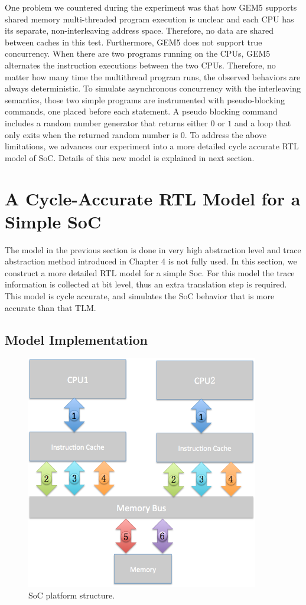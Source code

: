 \documentclass[12pt,frontmatter,copyright,thesis]{usfmanus}
\begin{document}
One problem we countered during the experiment  was that
how GEM5 supports shared memory
multi-threaded program execution is unclear and
each CPU has its separate, non-interleaving address space. 
Therefore,
no data are shared between caches in this test.
Furthermore, GEM5 does not support true concurrency.  When
there are two programs running on the CPUs, GEM5 alternates
the instruction executions between the two CPUs. Therefore,
no matter how many time the
multithread program runs, 
the observed behaviors are always deterministic.
To simulate
asynchronous concurrency with the interleaving semantics,
those two simple programs are instrumented with
pseudo-blocking commands, one placed before each statement.
A pseudo blocking command includes a random number generator
that returns either $0$ or $1$ and a loop that only exits
when the returned random number is $0$.
To address the above limitations,
we advances our experiment into a
more detailed cycle accurate RTL model of SoC. 
Details of this new model is explained in next section.



\section{A Cycle-Accurate RTL Model for a Simple SoC}
The model in the previous section is done in very high abstraction level and trace abstraction method
introduced in Chapter 4
is not fully used.
In this section, we construct a more detailed RTL model for a simple Soc.
For this model 
the trace information is collected at bit level, thus an extra translation step is required.
This model is cycle accurate, and simulates the SoC behavior that is more accurate than that TLM. 

\subsection{Model Implementation}

 \begin{figure} [h]
\centerline{
\includegraphics[width=4in]{RTL.png}}
\caption{SoC platform structure.}
\label{rtlstruc}
\end{figure}
\end{document}

